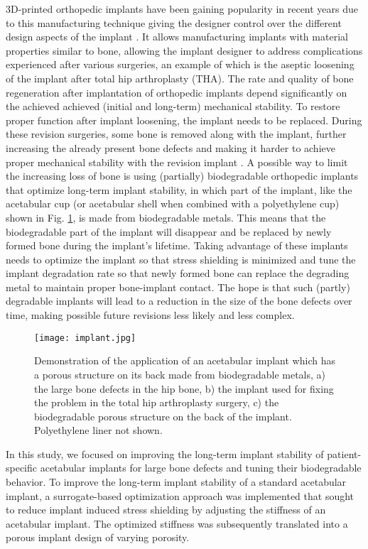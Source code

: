 3D-printed orthopedic implants have been gaining popularity in recent years due to this manufacturing technique giving the designer control over the different design aspects of the implant \cite{Kumar2021,Yadav2020}. It allows manufacturing implants with material properties similar to bone, allowing the implant designer to address complications experienced after various surgeries, an example of which is the aseptic loosening of the implant after total hip arthroplasty (\gls{THA}). The rate and quality of bone regeneration after implantation of orthopedic implants depend significantly on the achieved achieved (initial and long-term) mechanical stability. To restore proper function after implant loosening, the implant needs to be replaced. During these revision surgeries, some bone is removed along with the implant, further increasing the already present bone defects and making it harder to achieve proper mechanical stability with the revision implant \cite{Luthringer2014}. A possible way to limit the increasing loss of bone is using (partially) biodegradable orthopedic implants that optimize long-term implant stability, in which part of the implant, like the acetabular cup (or acetabular shell when combined with a polyethylene cup) shown in Fig. \ref{fig:cup_implant}, is made from biodegradable metals. This means that the biodegradable part of the implant will disappear and be replaced by newly formed bone during the implant's lifetime. Taking advantage of these implants needs to optimize the implant so that stress shielding is minimized and tune the implant degradation rate so that newly formed bone can replace the degrading metal to maintain proper bone-implant contact. The hope is that such (partly) degradable implants will lead to a reduction in the size of the bone defects over time, making possible future revisions less likely and less complex.

\begin{figure}[h]
\centering
\medskip
\texttt{[image: implant.jpg]}
\caption[Application of the acetabular implant]{Demonstration of the application of an acetabular implant which has a porous structure on its back made from biodegradable metals, a) the large bone defects in the hip bone, b) the implant used for fixing the problem in the total hip arthroplasty surgery, c) the biodegradable porous structure on the back of the implant. Polyethylene liner not shown.} \label{fig:cup_implant}
\end{figure}

In this study, we focused on improving the long-term implant stability of patient-specific acetabular implants for large bone defects and tuning their biodegradable behavior. To improve the long-term implant stability of a standard acetabular implant, a surrogate-based optimization approach was implemented that sought to reduce implant induced stress shielding by adjusting the stiffness of an acetabular implant. The optimized stiffness was subsequently translated into a porous implant design of varying porosity.

